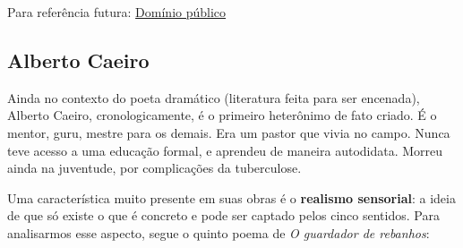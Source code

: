 Para referência futura: \href{http://arquivopessoa.net}{Domínio público}

\subsection{Alberto Caeiro}

Ainda no contexto do poeta dramático (literatura feita para ser encenada), Alberto Caeiro, cronologicamente, é o primeiro heterônimo de fato criado. É o mentor, guru, mestre para os demais. Era um pastor que vivia no campo. Nunca teve acesso a uma educação formal, e aprendeu de maneira autodidata. Morreu ainda na juventude, por complicações da tuberculose.

Uma característica muito presente em suas obras é o \textbf{realismo sensorial}: a ideia de que só existe o que é concreto e pode ser captado pelos cinco sentidos. Para analisarmos esse aspecto, segue o quinto poema de \textit{O guardador de rebanhos}:

